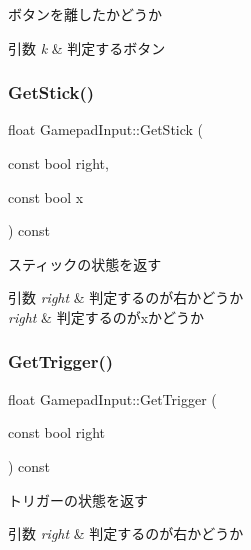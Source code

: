 ボタンを離したかどうか 


\begin{DoxyParams}{引数}
{\em k} & 判定するボタン \\
\hline
\end{DoxyParams}
\mbox{\label{class_gamepad_input_ab7e3fb80f81fcafdfc7c0f546c280929}} 
\subsubsection{\texorpdfstring{Get\+Stick()}{GetStick()}}
{\footnotesize\ttfamily float Gamepad\+Input\+::\+Get\+Stick (\begin{DoxyParamCaption}\item[{const bool}]{right,  }\item[{const bool}]{x }\end{DoxyParamCaption}) const\hspace{0.3cm}{\ttfamily [inline]}}



スティックの状態を返す 


\begin{DoxyParams}{引数}
{\em right} & 判定するのが右かどうか \\
\hline
{\em right} & 判定するのがxかどうか \\
\hline
\end{DoxyParams}
\mbox{\label{class_gamepad_input_aab528f55fe651996096e697acdec4546}} 
\subsubsection{\texorpdfstring{Get\+Trigger()}{GetTrigger()}}
{\footnotesize\ttfamily float Gamepad\+Input\+::\+Get\+Trigger (\begin{DoxyParamCaption}\item[{const bool}]{right }\end{DoxyParamCaption}) const\hspace{0.3cm}{\ttfamily [inline]}}



トリガーの状態を返す 


\begin{DoxyParams}{引数}
{\em right} & 判定するのが右かどうか \\
\hline
\end{DoxyParams}
\mbox{\label{class_gamepad_input_a3512c0cc4d57534c83db09c4b5377caa}} 
